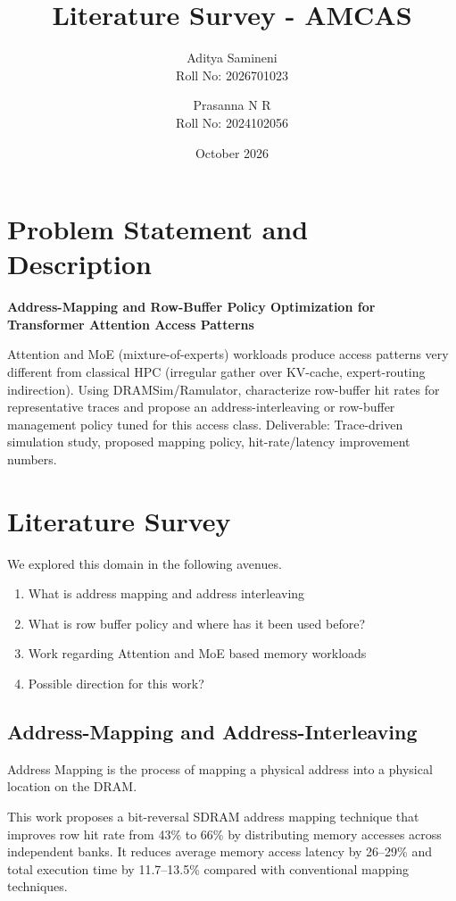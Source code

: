 \documentclass{article}
\title{Literature Survey - AMCAS}
\author{
    Aditya Samineni \\
    \small Roll No: 2026701023
    \and
    Prasanna N R \\
    \small Roll No: 2024102056
}
\date{October 2026}
\begin{document}
\maketitle

\section{Problem Statement and Description}

\textbf{Address-Mapping and Row-Buffer Policy Optimization for Transformer Attention Access Patterns}

Attention and MoE (mixture-of-experts) workloads produce access patterns very different from classical HPC (irregular gather over KV-cache, expert-routing indirection). Using DRAMSim/Ramulator, characterize row-buffer hit rates for representative traces and propose an address-interleaving or row-buffer management policy tuned for this access class. Deliverable: Trace-driven simulation study, proposed mapping policy, hit-rate/latency improvement numbers.


\section{Literature Survey}

We explored this domain in the following avenues.
\begin{enumerate}
    \item What is address mapping and address interleaving
    \item What is row buffer policy and where has it been used before?
    \item Work regarding Attention and MoE based memory workloads\
    \item Possible direction for this work?
\end{enumerate}

\subsection{Address-Mapping and Address-Interleaving}
Address Mapping is the process of mapping a physical address into a physical location on the DRAM.

This work \cite{shao2005bit} proposes a bit-reversal SDRAM address mapping technique that improves row hit rate from 43\% to 66\% by distributing memory accesses across independent banks. It reduces average memory access latency by 26–29\% and total execution time by 11.7–13.5\% compared with conventional mapping techniques. 
\end{document}
